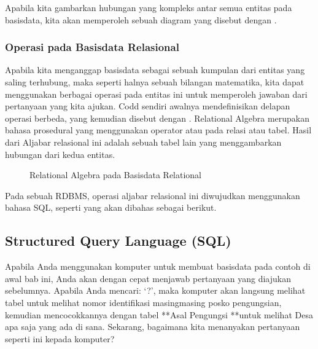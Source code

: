 \documentclass[letterpaper,10pt,english]{sphinxmanual}
\let\sphinxpxdimen\pdfpxdimen\else\newdimen\sphinxpxdimen
\begin{document}
Apabila kita gambarkan hubungan yang kompleks antar semua entitas pada basisdata, kita akan memperoleh sebuah diagram yang disebut dengan .


\subsubsection{Operasi pada Basisdata Relasional}
\label{\detokenize{sesi2/relationaldb:operasi-pada-basisdata-relasional}}
Apabila kita menganggap basisdata sebagai sebuah kumpulan dari entitas yang saling terhubung, maka seperti halnya sebuah bilangan matematika, kita dapat menggunakan berbagai operasi pada entitas ini untuk memperoleh jawaban dari pertanyaan yang kita ajukan. Codd sendiri awalnya mendefinisikan delapan operasi berbeda, yang kemudian disebut dengan . Relational Algebra merupakan bahasa prosedural yang menggunakan operator  atau  pada relasi atau tabel. Hasil dari Aljabar relasional ini adalah sebuah tabel lain yang menggambarkan hubungan dari kedua entitas.

\begin{figure}[htbp]
\centering
\capstart

\noindent\sphinxincludegraphics[height=300\sphinxpxdimen]{{2020-12-08-00-41-03}.png}
\caption{Relational Algebra pada Basisdata Relational}\label{\detokenize{sesi2/relationaldb:relag}}\end{figure}

Pada sebuah RDBMS, operasi aljabar relasional ini diwujudkan menggunakan bahasa SQL, seperti yang akan dibahas sebagai berikut.


\subsection{Structured Query Language (SQL)}
\label{\detokenize{sesi2/relationaldb:structured-query-language-sql}}
Apabila Anda menggunakan komputer untuk membuat basisdata pada contoh di awal bab ini, Anda akan dengan cepat menjawab pertanyaan yang diajukan sebelumnya. Apabila Anda mencari: ‘?’, maka komputer akan langsung melihat tabel  untuk melihat nomor identifikasi masing\sphinxhyphen{}masing posko pengungsian, kemudian mencocokkannya dengan tabel **Asal Pengungsi **untuk melihat Desa apa saja yang ada di sana. Sekarang, bagaimana kita menanyakan pertanyaan seperti ini kepada komputer?
\end{document}
